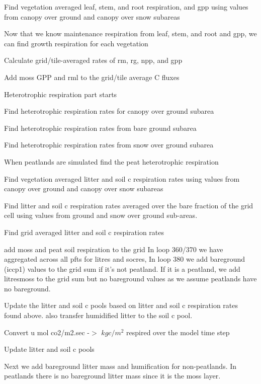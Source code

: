 Find vegetation averaged leaf, stem, and root respiration, and gpp using values from canopy over ground and canopy over snow subareas

Now that we know maintenance respiration from leaf, stem, and root and gpp, we can find growth respiration for each vegetation

Calculate grid/tile-\/averaged rates of rm, rg, npp, and gpp \begin{DoxyVerb}Add moss GPP and rml to the grid/tile average C fluxes \end{DoxyVerb}


\begin{DoxyVerb} Heterotrophic respiration part starts \end{DoxyVerb}


Find heterotrophic respiration rates for canopy over ground subarea

Find heterotrophic respiration rates from bare ground subarea

Find heterotrophic respiration rates from snow over ground subarea

When peatlands are simulated find the peat heterotrophic respiration

Find vegetation averaged litter and soil c respiration rates using values from canopy over ground and canopy over snow subareas

Find litter and soil c respiration rates averaged over the bare fraction of the grid cell using values from ground and snow over ground sub-\/areas.

Find grid averaged litter and soil c respiration rates

\begin{DoxyVerb}add moss and peat soil respiration to the grid
In loop 360/370 we have aggregated across all pfts for litres and socres, In loop 380 we add
bareground (iccp1) values to the grid sum if it's not peatland. If it is a peatland, we add litresmoss to
the grid sum but no bareground values as we assume peatlands have no bareground. \end{DoxyVerb}


Update the litter and soil c pools based on litter and soil c respiration rates found above. also transfer humidified litter to the soil c pool.

Convert u mol co2/m2.\+sec -\/$>$ $kg c/m^2$ respired over the model time step

Update litter and soil c pools \begin{DoxyVerb}     Next we add bareground litter mass and humification for non-peatlands. In
     peatlands there is no bareground litter mass since it is the moss layer. \end{DoxyVerb}


